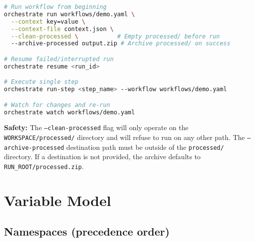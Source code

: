\documentclass[11pt,a4paper]{article}
\begin{document}
\begin{lstlisting}[language=bash, caption={CLI Commands}]
# Run workflow from beginning
orchestrate run workflows/demo.yaml \
  --context key=value \
  --context-file context.json \
  --clean-processed \           # Empty processed/ before run
  --archive-processed output.zip # Archive processed/ on success

# Resume failed/interrupted run
orchestrate resume <run_id>

# Execute single step
orchestrate run-step <step_name> --workflow workflows/demo.yaml

# Watch for changes and re-run
orchestrate watch workflows/demo.yaml
\end{lstlisting}

\textbf{Safety:} The \texttt{--clean-processed} flag will only operate on the \texttt{WORKSPACE/processed/} directory and will refuse to run on any other path. The \texttt{--archive-processed} destination path must be outside of the \texttt{processed/} directory. If a destination is not provided, the archive defaults to \texttt{RUN\_ROOT/processed.zip}.

\section{Variable Model}

\subsection{Namespaces (precedence order)}
\end{document}
